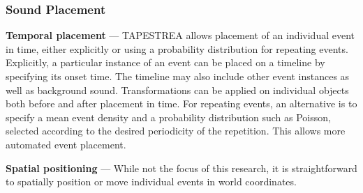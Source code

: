 \documentclass{acmsiggraph}               %
\begin{document}

\subsubsection{Sound Placement}

\textbf{Temporal placement} --- TAPESTREA allows placement of an individual event in time, either explicitly or using 
a probability distribution for repeating events.  
Explicitly, a particular instance of an event can be placed on a timeline by specifying its onset time. The timeline 
may also include other event instances as well as background sound. Transformations can be applied on individual 
objects both before and after placement in time. 
For repeating events, an alternative is to specify a mean event density and a probability distribution 
such as Poisson, selected according to the desired periodicity of the repetition. This allows more automated 
event placement. 

\textbf{Spatial positioning} --- While not the focus of this research, it 
is straightforward to spatially position or move individual events in world 
coordinates.


\end{document}
